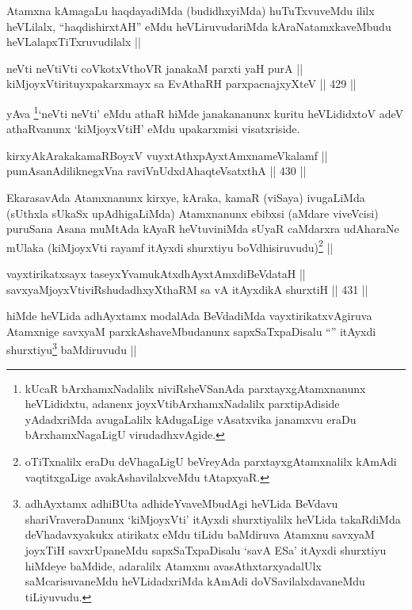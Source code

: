 \begin{artha}
Atamxna kAmagaLu haqdayadiMda (budidhxyiMda) huTuTxvuveMdu ililx
heVLilalx, ``haqdishirxtAH'' eMdu heVLiruvudariMda kAraNatamxkaveMbudu
heVLalapxTiTxruvudilalx ||
\end{artha}

\begin{shl}
neVti neVtiVti coVkotxV\s thoVR janakaM parxti yaH purA || \\
kiMjoyxVtirituyxpakarxmayx sa EvAthaRH parxpacnajxyXteV ||  429 ||  
\end{shl}

\begin{artha}
yAva \footnote{kUcaR bArxhamxNadalilx niviRsheVSanAda
  parxtayxgAtamxnanunx heVLididxtu, adanenx joyxVtibArxhamxNadalilx
  parxtipAdiside yAdadxriMda avugaLalilx kAdugaLige vAsatxvika
  janamxvu eraDu bArxhamxNagaLigU virudadhxvAgide.}`neVti neVti' eMdu athaR hiMde janakananunx kuritu heVLididxtoV
adeV athaRvanunx `kiMjoyxVtiH' eMdu upakarxmisi visatxriside. 
\end{artha}

\begin{shl}
kirxyAkArakakamaRBoyxV vuyxtAthxpAyx\s \s tAmxnameVkalamf || \\
pumAsanAdiliknegxVna raviVnUdxdAhaqteVsatxthA ||  430 ||  
\end{shl}

\begin{artha}
EkarasavAda Atamxnanunx kirxye, kAraka, kamaR (viSaya) ivugaLiMda
(sUthxla sUkaSx upAdhigaLiMda) Atamxnanunx ebibxsi (aMdare viveVcisi)
puruSana Asana muMtAda kAyaR heVtuviniMda sUyaR caMdarxra udAharaNe
mUlaka (kiMjoyxVti rayamf itAyxdi shurxtiyu
boVdhisiruvudu)\footnote{oTiTxnalilx eraDu deVhagaLigU beVreyAda
  parxtayxgAtamxnalilx kAmAdi vaqtitxgaLige avakAshavilalxveMdu
  tAtapxyaR.} ||
\end{artha}

\begin{shl}
vayxtirikatxsayx taseyxYvamukAtxdhAyxtAmxdiBeVdataH || \\
savxyaMjoyxVtiviRshudadhxyXthaRM sa vA itAyxdikA shurxtiH ||  431 ||  
\end{shl}

\begin{artha}
hiMde heVLida adhAyxtamx modalAda BeVdadiMda vayxtirikatxvAgiruva
Atamxnige savxyaM parxkAshaveMbudanunx sapxSaTxpaDisalu ``\stext''
itAyxdi shurxtiyu\footnote{adhAyxtamx adhiBUta adhideYvaveMbudAgi
  heVLida BeVdavu shariVraveraDanunx `kiMjoyxVti' itAyxdi
  shurxtiyalilx heVLida takaRdiMda deVhadavxyakukx atirikatx eMdu
  tiLidu baMdiruva Atamxnu savxyaM joyxTiH savxrUpaneMdu
  sapxSaTxpaDisalu `savA ESa' itAyxdi shurxtiyu hiMdeye baMdide,
  adaralilx Atamxnu avasAthxtarxyadalUlx saMcarisuvaneMdu
  heVLidadxriMda kAmAdi doVSavilalxdavaneMdu tiLiyuvudu.} baMdiruvudu ||
\end{artha}


